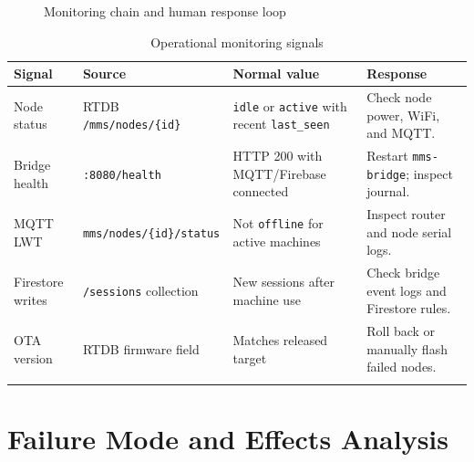 \begin{figure}[H]
\centering
{}
\caption{Monitoring chain and human response loop}
\label{fig:monitoring_chain}
\end{figure}

\begin{longtable}{L{3.5cm}L{4.5cm}L{3cm}L{3.5cm}}
\toprule
\textbf{Signal} & \textbf{Source} & \textbf{Normal value} & \textbf{Response} \\
\midrule
\endhead
Node status & RTDB \texttt{/mms/nodes/\{id\}} & \texttt{idle} or \texttt{active} with recent \texttt{last\_seen} & Check node power, WiFi, and MQTT. \\
Bridge health & \texttt{:8080/health} & HTTP 200 with MQTT/Firebase connected & Restart \texttt{mms-bridge}; inspect journal. \\
MQTT LWT & \texttt{mms/nodes/\{id\}/status} & Not \texttt{offline} for active machines & Inspect router and node serial logs. \\
Firestore writes & \texttt{/sessions} collection & New sessions after machine use & Check bridge event logs and Firestore rules. \\
OTA version & RTDB firmware field & Matches released target & Roll back or manually flash failed nodes. \\
\bottomrule
\caption{Operational monitoring signals}
\label{tab:monitoring_signals}
\end{longtable}

\section{Failure Mode and Effects Analysis}

